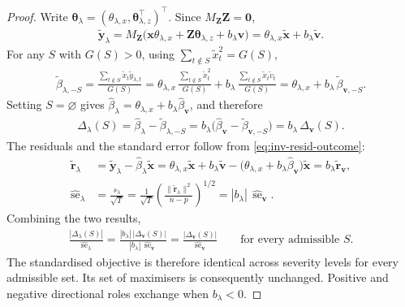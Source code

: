 \documentclass[../main.tex]{subfiles}
\begin{document}
\begin{proof}
Write \(\boldsymbol{\theta}_\lambda=(\theta_{\lambda,x},\boldsymbol{\theta}_{\lambda,z}^{\top})^{\top}\). Since \(M_{\mathbf{Z}}\mathbf{Z}=\mathbf{0}\),
\begin{align}
\widetilde{\mathbf{y}}_\lambda
=M_{\mathbf{Z}}\bigl(\mathbf{x}\theta_{\lambda,x}+\mathbf{Z}\boldsymbol{\theta}_{\lambda,z}+b_\lambda\mathbf{v}\bigr)
=\theta_{\lambda,x}\widetilde{\mathbf{x}}+b_\lambda\widetilde{\mathbf{v}} .
\label{eq:inv-resid-outcome}
\end{align}
For any \(S\) with \(G(S)>0\), using \(\sum_{t\notin S}\widetilde{x}_t^2=G(S)\),
\begin{align*}
\widetilde{\beta}_{\lambda,-S}
=\frac{\sum_{t\notin S}\widetilde{x}_t\widetilde{y}_{\lambda,t}}{G(S)}
=\theta_{\lambda,x}\,\frac{\sum_{t\notin S}\widetilde{x}_t^2}{G(S)}
+b_\lambda\,\frac{\sum_{t\notin S}\widetilde{x}_t\widetilde{v}_t}{G(S)}
=\theta_{\lambda,x}+b_\lambda\,\widetilde{\beta}_{\mathbf{v},-S}.
\end{align*}
Setting \(S=\varnothing\) gives \(\widehat{\beta}_\lambda=\theta_{\lambda,x}+b_\lambda\widehat{\beta}_{\mathbf{v}}\), and therefore
\begin{align*}
	\Delta_\lambda(S)
	=\widehat{\beta}_\lambda-\widetilde{\beta}_{\lambda,-S}
	=b_\lambda\bigl(\widehat{\beta}_{\mathbf{v}}-\widetilde{\beta}_{\mathbf{v},-S}\bigr)
	=b_\lambda\,\Delta_{\mathbf{v}}(S).
\end{align*}
The residuals and the standard error follow from \autoref{eq:inv-resid-outcome}:
\begin{align*}
\widetilde{\mathbf{r}}_\lambda
&=\widetilde{\mathbf{y}}_\lambda-\widehat{\beta}_\lambda\widetilde{\mathbf{x}}
=\theta_{\lambda,x}\widetilde{\mathbf{x}}+b_\lambda\widetilde{\mathbf{v}}
-\bigl(\theta_{\lambda,x}+b_\lambda\widehat{\beta}_{\mathbf{v}}\bigr)\widetilde{\mathbf{x}}
=b_\lambda\widetilde{\mathbf{r}}_{\mathbf{v}},\\
\widehat{\operatorname{se}}_\lambda
&=\frac{s_\lambda}{\sqrt{T}}
=\frac{1}{\sqrt{T}}\left(\frac{\lVert\widetilde{\mathbf{r}}_\lambda\rVert^2}{n-p}\right)^{1/2}
=|b_\lambda|\,\widehat{\operatorname{se}}_{\mathbf{v}} .
\end{align*}
Combining the two results,
\begin{align*}
\frac{|\Delta_\lambda(S)|}{\widehat{\operatorname{se}}_\lambda}
=\frac{|b_\lambda|\,|\Delta_{\mathbf{v}}(S)|}{|b_\lambda|\,\widehat{\operatorname{se}}_{\mathbf{v}}}
=\frac{|\Delta_{\mathbf{v}}(S)|}{\widehat{\operatorname{se}}_{\mathbf{v}}}
\qquad\text{for every admissible }S.
\end{align*}
The standardised objective is therefore identical across severity levels for every admissible set. Its set of maximisers is consequently unchanged. Positive and negative directional roles exchange when \(b_\lambda<0\).
\end{proof}
\end{document}

